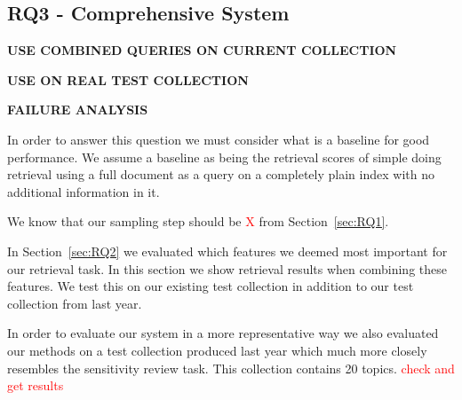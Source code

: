 \documentclass{mpaper}
\newcommand{\remove}[1]{\textcolor{red}{#1}}
\begin{document}
\begin{center}
\begin{table}[h]
\centering
{}
\caption{focus time calculations}
\label{focus_time_calculations}
\end{table}
\end{center}

\subsection{RQ3 - Comprehensive System}

\textbf{USE COMBINED QUERIES ON CURRENT COLLECTION}

\textbf{USE ON REAL TEST COLLECTION}

\textbf{FAILURE ANALYSIS}


In order to answer this question we must consider what is a baseline for good performance. We assume a baseline as being the retrieval scores of simple doing retrieval using a full document as a query on a completely plain index with no additional information in it.

We know that our sampling step should be \remove{X} from Section~\ref{sec:RQ1}.

In Section~\ref{sec:RQ2} we evaluated which features we deemed most important for our retrieval task. In this section we show retrieval results when combining these features.
We test this on our existing test collection in addition to our test collection from last year.


In order to evaluate our system in a more representative way we also evaluated our methods on a test collection produced last year which much more closely resembles the sensitivity review task.
This collection contains 20 topics. \remove{check and get results}
\end{document}
